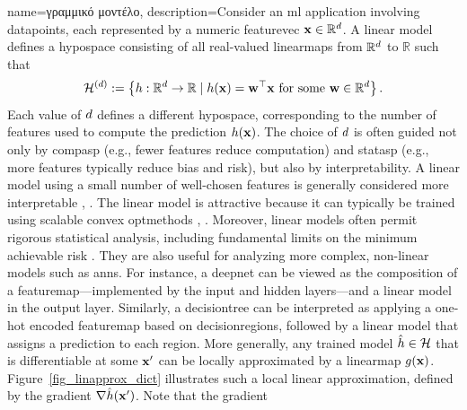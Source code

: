 {name={\foreignlanguage{greek}{γραμμικό μοντέλο}},
	description={Consider 
		an \gls{ml} application involving \gls{datapoint}s, each represented 
		by a numeric \gls{featurevec} ${\bf x} \in \mathbb{R}^{d}$. A linear \gls{model} defines 
		a \gls{hypospace} consisting of all real-valued \gls{linearmap}s from $\mathbb{R}^{d}$ to $\mathbb{R}$ such that
		\begin{equation}
			\label{equ_def_lin_model_hypspace_dict}
			\mathcal{H}^{(d)} := \left\{ h: \mathbb{R}^{d} \rightarrow \mathbb{R} \mid h({\bf x}) = {\bf w}^{\top} {\bf x} \text{ for some } {\bf w} \in \mathbb{R}^{d} \right\}.
		\end{equation}
		Each value of $d$ defines a different \gls{hypospace}, corresponding to the number of 
		\gls{feature}s used to compute the \gls{prediction} $h({\bf x})$. The choice of 
		$d$ is often guided not only by \gls{compasp} (e.g., fewer features reduce computation) and 
		\gls{statasp} (e.g., more features typically reduce \gls{bias} and \gls{risk}), but also by \gls{interpretability}. 
		A linear \gls{model} using a small number of well-chosen \gls{feature}s is generally considered 
		more interpretable \cite{rudin2019stop}, \cite{Ribeiro2016}.
		The linear \gls{model} is attractive because it can typically be trained using scalable \gls{convex} \gls{optmethod}s 
		\cite{hastie01statisticallearning}, \cite{BertsekasNonLinProgr}. Moreover, linear \gls{model}s often permit rigorous 
		statistical analysis, including fundamental limits on the \gls{minimum} achievable \gls{risk} \cite{Wain2019}. 
		They are also useful for analyzing more complex, non-linear \gls{model}s such as \gls{ann}s. For instance, 
		a \gls{deepnet} can be viewed as the composition of a \gls{featuremap}—implemented by the input and 
		hidden layers—and a linear \gls{model} in the output layer. Similarly, a \gls{decisiontree} can be interpreted 
		as applying a one-hot encoded \gls{featuremap} based on \gls{decisionregion}s, followed by a linear 
		\gls{model} that assigns a \gls{prediction} to each region.
		More generally, any trained \gls{model} $\hat{h} \in \mathcal{H}$ that is 
		\gls{differentiable} at some ${\bf x}'$ can be locally approximated by a \gls{linearmap} 
		$g({\bf x})$. Figure~\ref{fig_linapprox_dict} illustrates such a local linear approximation, 
		defined by the \gls{gradient} $\nabla \hat{h}({\bf x}')$. Note that the \gls{gradient} 
}}
